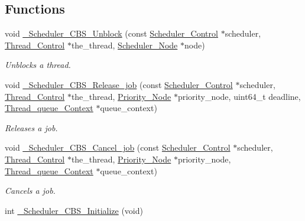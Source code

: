 \subsection*{Functions}
\begin{DoxyCompactItemize}
\item 
void \mbox{\hyperlink{group__RTEMSScoreSchedulerCBS_gae0d9c2720ee46efdfe87ebf87cd45cae}{\+\_\+\+Scheduler\+\_\+\+C\+B\+S\+\_\+\+Unblock}} (const \mbox{\hyperlink{struct__Scheduler__Control}{Scheduler\+\_\+\+Control}} $\ast$scheduler, \mbox{\hyperlink{struct__Thread__Control}{Thread\+\_\+\+Control}} $\ast$the\+\_\+thread, \mbox{\hyperlink{structScheduler__Node}{Scheduler\+\_\+\+Node}} $\ast$node)
\begin{DoxyCompactList}\small\item\em Unblocks a thread. \end{DoxyCompactList}\item 
void \mbox{\hyperlink{group__RTEMSScoreSchedulerCBS_ga26f13ab87c29b1b9abf5e8defae50d47}{\+\_\+\+Scheduler\+\_\+\+C\+B\+S\+\_\+\+Release\+\_\+job}} (const \mbox{\hyperlink{struct__Scheduler__Control}{Scheduler\+\_\+\+Control}} $\ast$scheduler, \mbox{\hyperlink{struct__Thread__Control}{Thread\+\_\+\+Control}} $\ast$the\+\_\+thread, \mbox{\hyperlink{structPriority__Node}{Priority\+\_\+\+Node}} $\ast$priority\+\_\+node, uint64\+\_\+t deadline, \mbox{\hyperlink{structThread__queue__Context}{Thread\+\_\+queue\+\_\+\+Context}} $\ast$queue\+\_\+context)
\begin{DoxyCompactList}\small\item\em Releases a job. \end{DoxyCompactList}\item 
void \mbox{\hyperlink{group__RTEMSScoreSchedulerCBS_gaa7df4531e6a166ebebde6355dba251a6}{\+\_\+\+Scheduler\+\_\+\+C\+B\+S\+\_\+\+Cancel\+\_\+job}} (const \mbox{\hyperlink{struct__Scheduler__Control}{Scheduler\+\_\+\+Control}} $\ast$scheduler, \mbox{\hyperlink{struct__Thread__Control}{Thread\+\_\+\+Control}} $\ast$the\+\_\+thread, \mbox{\hyperlink{structPriority__Node}{Priority\+\_\+\+Node}} $\ast$priority\+\_\+node, \mbox{\hyperlink{structThread__queue__Context}{Thread\+\_\+queue\+\_\+\+Context}} $\ast$queue\+\_\+context)
\begin{DoxyCompactList}\small\item\em Cancels a job. \end{DoxyCompactList}\item 
int \mbox{\hyperlink{group__RTEMSScoreSchedulerCBS_gad7d02d4d314db30e554b22d2f3c0054d}{\+\_\+\+Scheduler\+\_\+\+C\+B\+S\+\_\+\+Initialize}} (void)

\end{DoxyCompactItemize}
